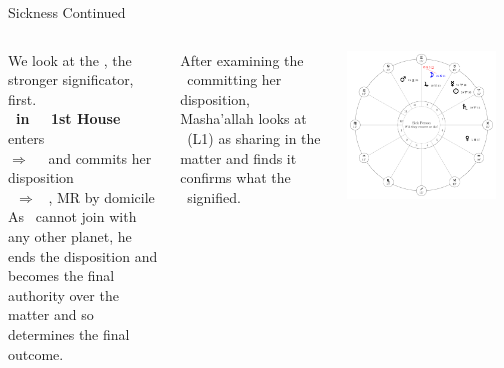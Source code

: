 \begin{frame}[t]{Sickness Continued}
\begin{columns}[T, onlytextwidth]
We look at the \Moon, the stronger significator, first. \\
\vspace{0.2cm}
\textbf{\Moon\ in \Taurus\ \Trine\ 1st House} enters \Gemini \\
$\Rightarrow$ \Square\ \Venus\ and commits her disposition \\
\Venus\ $\Rightarrow$ \Sextile\ \Jupiter, MR by domicile \\

\vspace{0.2cm}
As \Jupiter\ cannot join with any other planet\footnotemark[1], he ends the disposition and becomes the final authority over the matter and so determines the final outcome.

\vspace{0.2cm}
After examining the \Moon\ committing her disposition, Masha'allah looks at \Mercury\ (L1) as sharing in the matter and finds it confirms what the \Moon\ signified.



\begin{center}
{\includegraphics[width=0.9\textwidth]{charts/21a-chart-sickness}} \\
\vspace{-0.2cm}
\end{center}
\end{columns}
\end{frame}
